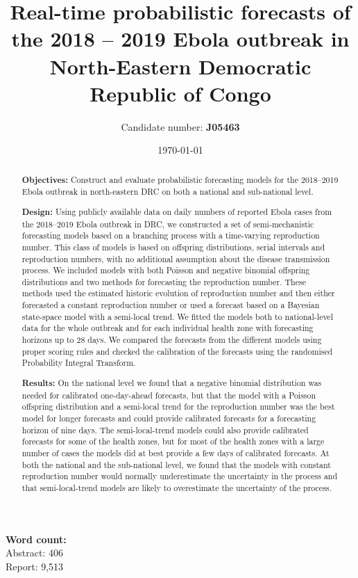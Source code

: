 \documentclass[12pt]{article}
\title{Real-time probabilistic forecasts of the 2018 -- 2019 Ebola outbreak in North-Eastern Democratic \\Republic of Congo}
\author{
  Candidate number: {\bf J05463}
}
\date{\today}
\begin{document}
\maketitle
\noindent
{\bf Word count:}\\
Abstract: 406  \\%
Report: 9,513  %

\begin{abstract}
  {\bf Objectives:} Construct and evaluate probabilistic forecasting models for the 2018--2019 Ebola outbreak in north-eastern DRC on both a national and sub-national level.
  
  \medskip
  
  {\bf Design:} Using publicly available data on daily numbers of reported Ebola cases from the 2018--2019 Ebola outbreak in DRC, we constructed a set of semi-mechanistic forecasting models based on a branching process with a time-varying reproduction number. This class of models is based on offspring distributions, serial intervals and reproduction numbers, with no additional assumption about the disease transmission process. We included models with both Poisson and negative binomial offspring distributions and two methods for forecasting the reproduction number. These methods used the estimated historic evolution of reproduction number and then either forecasted a constant reproduction number or used a forecast based on a Bayesian state-space model with a semi-local trend. We fitted the models both to national-level data for the whole outbreak and for each individual health zone with forecasting horizons up to 28 days. We compared the forecasts from the different models using proper scoring rules and checked the calibration of the forecasts using the randomised Probability Integral Transform. 

  \medskip
  
  {\bf Results:} On the national level we found that a negative binomial distribution was needed for calibrated one-day-ahead forecasts, but that the model with a Poisson offspring distribution and a semi-local trend for the reproduction number was the best model for longer forecasts and could provide calibrated forecasts for a forecasting horizon of nine days. The semi-local-trend models could also provide calibrated forecasts for some of the health zones, but for most of the health zones with a large number of cases the models did at best provide a few days of calibrated forecasts. At both the national and the sub-national level, we found that the models with constant reproduction number would normally underestimate the uncertainty in the process and that semi-local-trend models are likely to overestimate the uncertainty of the process. 


\end{abstract}
\end{document}
